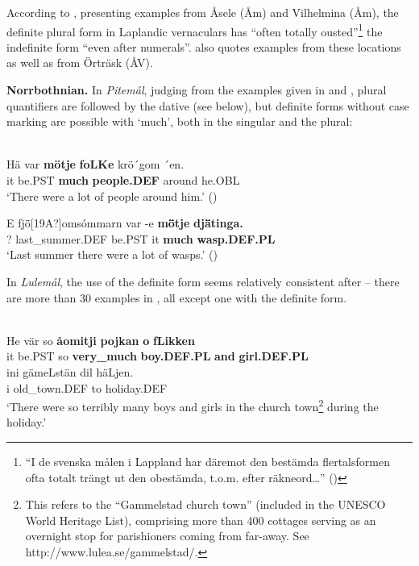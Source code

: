 According to \citet[282]{ÅgrenEtAl1954}, presenting examples from Åsele (Åm) and Vilhelmina (Åm), the definite plural form in Laplandic vernaculars has “often totally ousted”\footnote{ “I de svenska målen i Lappland har däremot den bestämda flertalsformen ofta totalt trängt ut den obestämda, t.o.m. efter räkneord…” (\citet[282]{ÅgrenEtAl1954})} the indefinite form “even after numerals”.  \citet[17]{Delsing2003a} also quotes examples from these locations as well as from Örträsk (ÅV). 

\textbf{Norrbothnian.} In \textit{Pitemål}, judging from the examples given in \citet{Brännström1993} and \citet{LidströmEtAl1991}, plural quantifiers are followed by the dative (see below), but definite forms without case marking are possible with  ‘much’, both in the singular and the plural:

\ea\label{}
\\
\gll Hä  var  \textbf{mö{\textasciigrave}tje} \textbf{  foLKe} krö´gom  ´en.\\
it  be.PST  \textbf{much} \textbf{people.DEF} around  he.OBL\\
\glt ‘There were a lot of people around him.’ (\citet[52]{Brännström1993})

\z

\ea
\gll E  fj\={ö}[19A?]omsómmarn  var  {}-e  \textbf{m\={ö}tje} \textbf{  dj\={ä}tinga.}\\
?  last\_summer.DEF  be.PST  it  \textbf{much} \textbf{wasp.DEF.PL}\\
\glt ‘Last summer there were a lot of wasps.’ (\citet[93]{BerglundEtAl1991})

\z

In \textit{Lulemål}, the use of the definite form seems relatively consistent after  – there are more than 30 examples in \citet{Nyström1993}, all except one with the definite form. 

\ea \label{} 
\\
\gll He  vär  so  \textbf{åomitji} \textbf{pojkan} \textbf{o} \textbf{fLikken}\\
it  be.PST  so  \textbf{very\_much} \textbf{boy.DEF.PL} \textbf{and} \textbf{girl.DEF.PL}\\
\gll ini  gämeLstän  dil  häLjen.\\
i  old\_town.DEF  to  holiday.DEF\\
\glt ‘There were so terribly many boys and girls in the church town\footnote{ This refers to the “Gammelstad church town” (included in the UNESCO World Heritage List), comprising more than 400 cottages serving as an overnight stop for parishioners coming from far-away. See http://www.lulea.se/gammelstad/.} during the holiday.’

